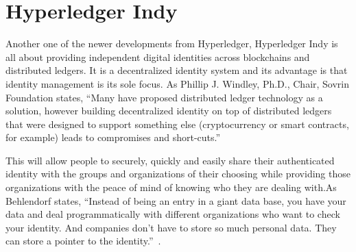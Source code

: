 \section{Hyperledger Indy}

Another one of the newer developments from Hyperledger, Hyperledger Indy 
is all about providing independent digital identities across blockchains 
and distributed ledgers. It is a decentralized identity system and its 
advantage is that identity management is its sole focus. 
As Phillip J. Windley, Ph.D., Chair, Sovrin Foundation states,  
“Many have proposed distributed ledger technology as a solution, 
however building decentralized identity on top of distributed ledgers 
that were designed to support something else (cryptocurrency or smart contracts, 
for example) leads to compromises and short-cuts.”~\cite{Windley}

This will allow people to securely, quickly and easily share their authenticated 
identity with the groups and organizations of their choosing while providing those 
organizations with the peace of mind of knowing who they are dealing with.As Behlendorf 
states, “Instead of being an entry in a giant data base, you have your data and deal 
programmatically with different organizations who want to check your identity. And 
companies don’t have to store so much personal data. They can store a pointer to the 
identity.”~\cite{Behlendor}.
